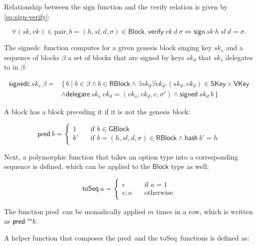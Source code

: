 \documentclass[11pt,a4paper]{article}
\newcommand\Set[2]{\{\,#1\mid#2\,\}}
\newcommand{\fun}[1]{\mathsf{#1}}
\newcommand{\type}[1]{\mathsf{#1}}
\newcommand{\GBlock}{\type{GBlock}}
\newcommand{\RBlock}{\type{RBlock}}
\newcommand{\Block}{\type{Block}}
\newcommand{\SKey}{\type{SKey}}
\newcommand{\VKey}{\type{VKey}}
\newcommand{\hashname}{hash}
\newcommand{\signname}{sign}
\newcommand{\signedname}{signed}
\newcommand{\signedseqname}{signedc}
\newcommand{\verifyname}{verify}
\newcommand{\delegatename}{delegate}
\newcommand{\keypairname}{pair}
\newcommand{\predbname}{pred} %
\newcommand{\toseqname}{toSeq} %
\newcommand{\sign}[4]{\fun{\signname}\ #1 ~ #2 ~ #3 ~ #4}
\newcommand{\signed}[2]{\fun{\signedname}\ #1 ~ #2}
\newcommand{\signedwindow}[2]{\fun{\signedseqname}\ #1 ~ #2}
\newcommand{\verify}[3]{\fun{\verifyname} ~ #1 ~ #2 ~ #3}
\newcommand{\hash}[1]{\fun{\hashname}\ #1}
\newcommand{\delegate}[2]{\fun{\delegatename}\ #1 ~ #2}
\newcommand{\predb}[1]{\fun{\predbname} ~ #1}
\newcommand{\toseq}[1]{\fun{\toseqname} ~ #1}
\begin{document}
Relationship between the $\text{\signname}$ function and the
$\text{\verifyname}$ relation is given by \eqref{eq:sign-verify}:

\begin{equation}
  \label{eq:sign-verify}
  \forall (sk, vk) \in \text{\keypairname}, b = (h, sl, d, \sigma) \in \Block.\
  \verify{vk}{d}{\sigma} \iff \sign{sk}{h}{sl}{d} = \sigma.
\end{equation}


The \signedseqname\ function computes for a given genesis block singing key $sk_s$ and a sequence of blocks $\beta$ a set of blocks that are signed by keys $sk_d$ that $sk_s$ delegates to in $\beta$:

\begin{align}
  \label{eq:signed-window}
  \signedwindow{sk_s}{\beta} = & \Set{b}{b \in \beta \wedge b \in \RBlock \wedge \exists sk_d \exists vk_d. (sk_d, vk_d) \in \SKey \times \VKey \\
  & \wedge \delegate{sk_s}{vk_d} = (vk_s, vk_d, e, \sigma') \wedge \signed{sk_d}{b}}
\end{align}


A block has a block preceding it if it is not the genesis block:

\begin{equation}
  \label{eq:predb}
  \predb{b} =
  \begin{cases}
    1 & \quad \text{if } b \in \GBlock \\
    b' & \quad \text{if } b = (h, sl, d, \sigma) \in \RBlock \wedge \hash{b'} = h
  \end{cases}
\end{equation}

Next, a polymorphic function that takes an option type into a corresponding
sequence is defined, which can be applied to the $\Block$ type as well:

\begin{equation}
  \label{eq:toseq}
  \toseq{a} =
  \begin{cases}
    \epsilon & \quad \text{if } a = 1 \\
    \epsilon; a & \quad \text{otherwise}
  \end{cases}
\end{equation}

The function \predbname\ can be monadically applied $m$ times in a row, which
is written as $\predb^m{b}$.

A helper function that composes the \predbname\ and the \toseqname\
functions is defined as:
\end{document}
